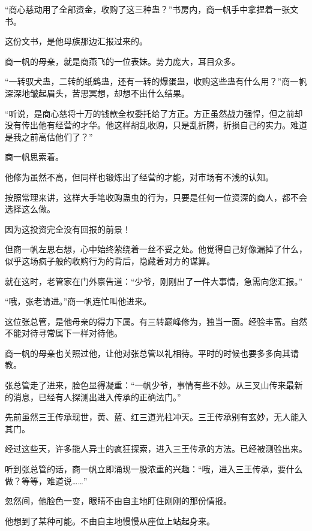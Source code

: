 
\begin{this_body}



“商心慈动用了全部资金，收购了这三种蛊？”书房内，商一帆手中拿捏着一张文书。

这份文书，是他母族那边汇报过来的。

商一帆的母亲，就是商燕飞的一位表妹。势力庞大，耳目众多。

“一转驭犬蛊，二转的纸鹤蛊，还有一转的爆蛋蛊，收购这些蛊有什么用？”商一帆深深地皱起眉头，苦思冥想，却想不出什么结果。

“听说，是商心慈将十万的钱款全权委托给了方正。方正虽然战力强悍，但之前却没有传出他有经营的才华。他这样胡乱收购，只是乱折腾，折损自己的实力。难道是我之前高估他们了？”

商一帆思索着。

他修为虽然不高，但同样也锻炼出了经营的才能，对市场有不浅的认知。

按照常理来讲，这样大手笔收购蛊虫的行为，只要是任何一位资深的商人，都不会选择这么做。

因为这投资完全没有回报的前景！

但商一帆左思右想，心中始终萦绕着一丝不妥之处。他觉得自己好像漏掉了什么，似乎这场疯子般的收购行为的背后，隐藏着对方的谋算。

就在这时，老管家在门外禀告道：“少爷，刚刚出了一件大事情，急需向您汇报。”

“哦，张老请进。”商一帆连忙叫他进来。

这位张总管，是他母亲的得力下属。有三转巅峰修为，独当一面。经验丰富。自然不能对待寻常属下一样对待他。

商一帆的母亲也关照过他，让他对张总管以礼相待。平时的时候也要多多向其请教。

张总管走了进来，脸色显得凝重：“一帆少爷，事情有些不妙。从三叉山传来最新的消息，已经有人探测出进入传承的正确法门。”

先前虽然三王传承现世，黄、蓝、红三道光柱冲天。三王传承别有玄妙，无人能入其门。

经过这些天，许多能人异士的疯狂探索，进入三王传承的方法。已经被测验出来。

听到张总管的话，商一帆立即涌现一股浓重的兴趣：“哦，进入三王传承，要什么做？等等，难道说……”

忽然间，他脸色一变，眼睛不由自主地盯住刚刚的那份情报。

他想到了某种可能。不由自主地慢慢从座位上站起身来。


\end{this_body}
